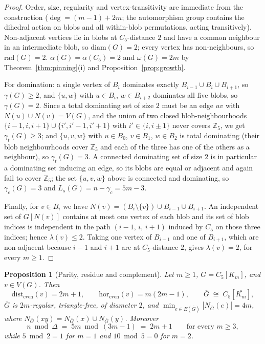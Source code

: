 \documentclass[10pt,a4paper]{article}
\theoremstyle{plain}
\newtheorem{proposition}[theorem]{Proposition}
\theoremstyle{definition}
\newcommand{\ZZ}{\mathbb{Z}}
\newcommand{\ind}{\alpha}
\newcommand{\de}{\mathrm{dist_{even}}}
\newcommand{\eh}{\mathrm{hor_{even}}}
\newcommand{\gt}{\gamma_t}
\newcommand{\gc}{\gamma_c}
\newcommand{\Ls}{L_s}
\newcommand{\blow}[2]{#1[K_{#2}]}
\begin{document}
\begin{proof}
Order, size, regularity and vertex-transitivity are immediate from the construction
($\deg = (m-1) + 2m$; the automorphism group contains the dihedral action on blobs and all
within-blob permutations, acting transitively). Non-adjacent vertices lie in blobs at $C_5$-distance
$2$ and have a common neighbour in an intermediate blob, so $\mathrm{diam}(G) = 2$; every vertex
has non-neighbours, so $\mathrm{rad}(G) = 2$. $\ind(G) = \ind(C_5) = 2$ and $\omega(G) = 2m$ by
Theorem~\ref{thm:pinning}(i) and Proposition~\ref{prop:growth}.

For domination: a single vertex of $B_i$ dominates exactly $B_{i-1} \cup B_i \cup B_{i+1}$, so
$\gamma(G) \ge 2$, and $\{u,w\}$ with $u \in B_i$, $w \in B_{i+2}$ dominates all five blobs, so
$\gamma(G) = 2$. Since a total dominating set of size $2$ must be an edge $uv$ with
$N(u) \cup N(v) = V(G)$, and the union of two closed blob-neighbourhoods
$\{i-1,i,i+1\} \cup \{i',i'-1,i'+1\}$ with $i' \in \{i, i \pm 1\}$ never covers $\ZZ_5$, we get
$\gt(G) \ge 3$; and $\{u,v,w\}$ with $u \in B_0$, $v \in B_1$, $w \in B_2$ is total dominating
(their blob neighbourhoods cover $\ZZ_5$ and each of the three has one of the others as a
neighbour), so $\gt(G) = 3$. A connected dominating set of size $2$ is in particular a
dominating set inducing an edge, so its blobs are equal or adjacent and again fail to cover
$\ZZ_5$; the set $\{u,v,w\}$ above is connected and dominating, so $\gc(G) = 3$ and
$\Ls(G) = n - \gc = 5m - 3$.

Finally, for $v \in B_i$ we have $N(v) = (B_i \setminus \{v\}) \cup B_{i-1} \cup B_{i+1}$. An
independent set of $G[N(v)]$ contains at most one vertex of each blob and its set of blob
indices is independent in the path $(i-1,\,i,\,i+1)$ induced by $C_5$ on those three indices;
hence $\lambda(v) \le 2$. Taking one vertex of $B_{i-1}$ and one of $B_{i+1}$, which are
non-adjacent because $i-1$ and $i+1$ are at $C_5$-distance $2$, gives $\lambda(v) = 2$, for
every $m \ge 1$.
\end{proof}

\begin{proposition}[Parity, residue and complement]\label{prop:parity}
Let $m \ge 1$, $G = \blow{C_5}{m}$, and $v \in V(G)$. Then
\[
\de(v) = 2m+1, \qquad
\eh(v) = m(2m-1), \qquad
\overline{G} \;\cong\; C_5[\overline{K_m}] ,
\]
$\overline{G}$ is $2m$-regular, triangle-free, of diameter $2$, and
$\min_{e \in E(\overline{G})} |N_{\overline{G}}(e)| = 4m$, where
$N_{\overline{G}}(xy) = N_{\overline{G}}(x) \cup N_{\overline{G}}(y)$. Moreover
\[
n \bmod \Delta \;=\; 5m \bmod (3m-1) \;=\; 2m+1 \qquad \text{for every } m \ge 3,
\]
while $5 \bmod 2 = 1$ for $m = 1$ and $10 \bmod 5 = 0$ for $m = 2$.
\end{proposition}
\end{document}
